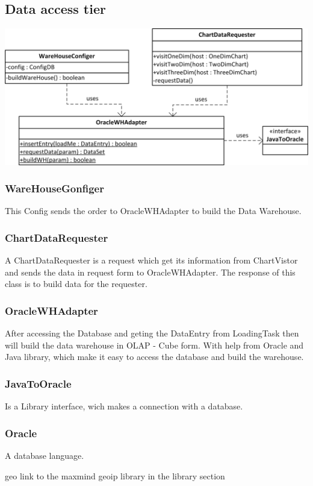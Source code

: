 \subsection{Data access tier}

\begin{center}
\includegraphics{Pictures/Parts/Data.png}
\end{center} 

\subsubsection*{WareHouseGonfiger}

This Config sends the order to OracleWHAdapter to build the Data Warehouse.

\subsubsection*{ChartDataRequester}

A ChartDataRequester is a request which get its information from ChartVistor
and sends the data in request form to OracleWHAdapter. %
The response of this class is to build data for the requester.

\subsubsection*{OracleWHAdapter}

After accessing the Database and geting the DataEntry from LoadingTask then will build %
the data warehouse in OLAP - Cube form. With help from Oracle %
and Java library, which make it easy to access the database and build the warehouse. %
 
\subsubsection*{JavaToOracle}

Is a Library interface, wich makes a connection with a database.

\subsubsection*{Oracle}

A database language. %

geo
 link to the maxmind geoip library in the library section
